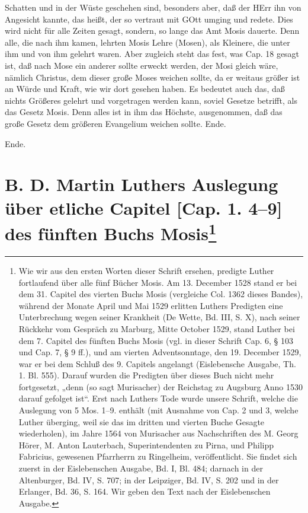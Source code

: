 Schatten und in der Wüste geschehen sind, besonders aber, daß der HErr ihn von Angesicht kannte, das heißt, der so vertraut mit GOtt umging und redete. Dies wird nicht für alle Zeiten gesagt, sondern, so lange das Amt Mosis dauerte. Denn alle, die nach ihm kamen, lehrten Mosis Lehre (Mosen), als Kleinere, die unter ihm und von ihm gelehrt waren. Aber zugleich steht das fest, was Cap. 18 gesagt ist, daß nach Mose ein anderer sollte erweckt werden, der Mosi gleich wäre, nämlich Christus, dem dieser große Moses weichen sollte, da er weitaus größer ist an Würde und Kraft, wie wir dort gesehen haben. Es bedeutet auch das, daß nichts Größeres gelehrt und vorgetragen werden kann, soviel Gesetze betrifft, als das Gesetz Mosis. Denn alles ist in ihm das Höchste, ausgenommen, daß das große Gesetz dem größeren Evangelium weichen sollte. Ende.

Ende.

\chapter[{B. D. Martin Luthers Auslegung über etliche Capitel [Cap.}]{B. D. Martin Luthers Auslegung über etliche Capitel [Cap. 1. 4–9] des fünften Buchs Mosis\footnote{Wie wir aus den ersten Worten dieser Schrift ersehen, predigte Luther fortlaufend über alle fünf Bücher Mosis. Am 13. December 1528 stand er bei dem 31. Capitel des vierten Buchs Mosis (vergleiche Col. 1362 dieses Bandes), während der Monate April und Mai 1529 erlitten Luthers Predigten eine Unterbrechung wegen seiner Krankheit (De Wette, Bd. III, S. X), nach seiner Rückkehr vom Gespräch zu Marburg, Mitte October 1529, stand Luther bei dem 7. Capitel des fünften Buchs Mosis (vgl. in dieser Schrift Cap. 6, § 103 und Cap. 7, § 9 ff.), und am vierten Adventsonntage, den 19. December 1529, war er bei dem Schluß des 9. Capitels angelangt (Eislebensche Ausgabe, Th. 1. Bl. 555). Darauf wurden die Predigten über dieses Buch nicht mehr fortgesetzt, „denn (so sagt Murisacher) der Reichstag zu Augsburg Anno 1530 darauf gefolget ist“. Erst nach Luthers Tode wurde unsere Schrift, welche die Auslegung von 5 Mos. 1–9. enthält (mit Ausnahme von Cap. 2 und 3, welche Luther überging, weil sie das im dritten und vierten Buche Gesagte wiederholen), im Jahre 1564 von Murisacher aus Nachschriften des M. Georg Hörer, M. Anton Lauterbach, Superintendenten zu Pirna, und Philipp Fabricius, gewesenen Pfarrherrn zu Ringelheim, veröffentlicht. Sie findet sich zuerst in der Eislebenschen Ausgabe, Bd. I, Bl. 484; darnach in der Altenburger, Bd. IV, S. 707; in der Leipziger, Bd. IV, S. 202 und in der Erlanger, Bd. 36, S. 164. Wir geben den Text nach der Eislebenschen Ausgabe.}}

